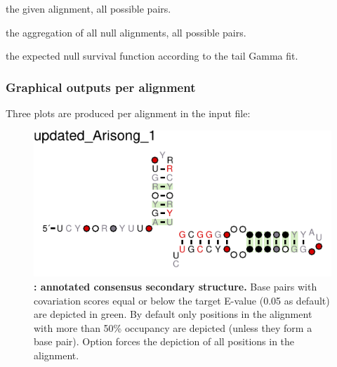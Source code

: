  \begin{sreitems}{}
 \item[\prog{First functions}] the given alignment, all possible pairs.
 \item[\prog{Second function}] the aggregation of all null alignments, all possible pairs.
 \item[\prog{Third function}] the expected null survival function according to the tail Gamma fit.
 \end{sreitems}


\clearpage
\subsubsection{Graphical outputs per alignment}
 Three plots are produced per alignment in the input file: 

 \begin{figure}[h]
   \includegraphics[scale=1.5]{Arisong_R2R.pdf} 
 \caption{\small\textbf{:
     annotated consensus secondary structure.} Base pairs with
   covariation scores equal or below the target E-value (0.05 as
   default) are depicted in green. By default only positions in the
   alignment with more than 50\% occupancy are depicted (unless they form
   a base pair). Option  forces the depiction of all
   positions in the alignment.  }
 \label{fig:r2r}
 \end{figure}

